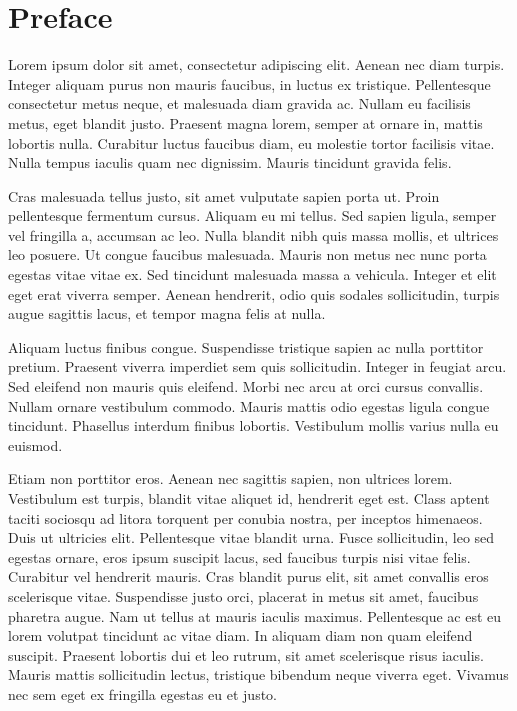 \chapter*{Preface}

Lorem ipsum dolor sit amet, consectetur adipiscing elit. Aenean nec diam turpis. Integer aliquam purus non mauris faucibus, in luctus ex tristique. Pellentesque consectetur metus neque, et malesuada diam gravida ac. Nullam eu facilisis metus, eget blandit justo. Praesent magna lorem, semper at ornare in, mattis lobortis nulla. Curabitur luctus faucibus diam, eu molestie tortor facilisis vitae. Nulla tempus iaculis quam nec dignissim. Mauris tincidunt gravida felis.

Cras malesuada tellus justo, sit amet vulputate sapien porta ut. Proin pellentesque fermentum cursus. Aliquam eu mi tellus. Sed sapien ligula, semper vel fringilla a, accumsan ac leo. Nulla blandit nibh quis massa mollis, et ultrices leo posuere. Ut congue faucibus malesuada. Mauris non metus nec nunc porta egestas vitae vitae ex. Sed tincidunt malesuada massa a vehicula. Integer et elit eget erat viverra semper. Aenean hendrerit, odio quis sodales sollicitudin, turpis augue sagittis lacus, et tempor magna felis at nulla.

Aliquam luctus finibus congue. Suspendisse tristique sapien ac nulla porttitor pretium. Praesent viverra imperdiet sem quis sollicitudin. Integer in feugiat arcu. Sed eleifend non mauris quis eleifend. Morbi nec arcu at orci cursus convallis. Nullam ornare vestibulum commodo. Mauris mattis odio egestas ligula congue tincidunt. Phasellus interdum finibus lobortis. Vestibulum mollis varius nulla eu euismod.

Etiam non porttitor eros. Aenean nec sagittis sapien, non ultrices lorem. Vestibulum est turpis, blandit vitae aliquet id, hendrerit eget est. Class aptent taciti sociosqu ad litora torquent per conubia nostra, per inceptos himenaeos. Duis ut ultricies elit. Pellentesque vitae blandit urna. Fusce sollicitudin, leo sed egestas ornare, eros ipsum suscipit lacus, sed faucibus turpis nisi vitae felis. Curabitur vel hendrerit mauris. Cras blandit purus elit, sit amet convallis eros scelerisque vitae. Suspendisse justo orci, placerat in metus sit amet, faucibus pharetra augue. Nam ut tellus at mauris iaculis maximus. Pellentesque ac est eu lorem volutpat tincidunt ac vitae diam. In aliquam diam non quam eleifend suscipit. Praesent lobortis dui et leo rutrum, sit amet scelerisque risus iaculis. Mauris mattis sollicitudin lectus, tristique bibendum neque viverra eget. Vivamus nec sem eget ex fringilla egestas eu et justo.

